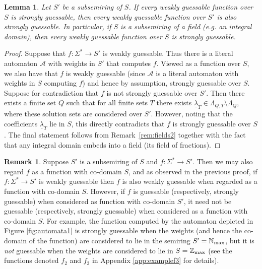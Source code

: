 \documentclass[10pt,a4paper]{amsart}
\newtheorem{lem}[thm]{Lemma}
\theoremstyle{definition}
\newtheorem{rem}[thm]{Remark}
\numberwithin{equation}{section}
\numberwithin{theorem}{section}
\begin{document}
		\begin{lem}
			\label{prop:subsemiring}
			Let $S'$ be a subsemiring of $S$. If every weakly guessable function over $S$ is strongly guessable, then every weakly guessable function over $S'$ is also strongly guessable.
   In particular, if $S$ is a subsemiring of a field (e.g. an integral domain), then every weakly guessable function over $S$ is strongly guessable.
		\end{lem}
	
		\begin{proof}
	Suppose that $f: \Sigma^* \rightarrow S'$ is weakly guessable. Thus there is a literal automaton $\mathcal{A}$ with weights in $S'$ that computes $f$. Viewed as a function over $S$, we also have that $f$ is weakly guessable (since $\mathcal{A}$ is a literal automaton with weights in $S$ computing $f$) and hence by assumption, strongly guessable over $S$. Suppose for contradiction that $f$ is not strongly guessable over $S'$. Then there exists a finite set $Q$ such that for all finite sets $T$ there exists $\underline{\lambda}_T \in \Lambda_{Q, T} \setminus \Lambda_Q$, where these solution sets are considered over $S'$. However, noting that the coefficients $\underline{\lambda}_T$ lie in $S$, this directly contradicts that $f$ is strongly guessable over $S$. The final statement follows from Remark~\ref{rem:fields2} together with the fact that any integral domain embeds into a field (its field of fractions).
\end{proof}	

\begin{rem}
Suppose $S'$ is a subsemiring of $S$ and $f: \Sigma^* \rightarrow S'$. Then we may also regard $f$ as a function with co-domain $S$, and as observed in the previous proof, if $f: \Sigma^* \rightarrow S'$ is weakly guessable then $f$ is also weakly guessable when regarded as a function with co-domain $S$. However, if $f$ is guessable (respectively, strongly guessable) when considered as function with co-domain $S'$, it need not be guessable (respectively, strongly guessable) when considered as a function with co-domain $S$. For example, the function computed by the automaton depicted in Figure \ref{fig:automata1} is strongly guessable when the weights (and hence the co-domain of the function) are considered to lie in the semiring $S'=\mathbb{N}_{\rm max}$, but it is \emph{not} guessable when the weights are considered to lie in $S=\mathbb{Z}_{\rm max}$ (see the functions denoted $f_2$ and $f_3$ in Appendix \ref{app:examplef3} for details). 
\end{rem}
\end{document}
